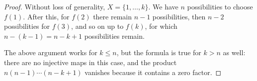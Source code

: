 \begin{proof}
Without loss of generality, $X = \{1, \ldots, k\}$.
We have $n$ possibilities to choose $f(1)$.
After this, for $f(2)$ there remain $n-1$ possibilities, then $n-2$ possibilities for $f(3)$,
and so on up to $f(k)$, for which $n-(k-1) = n-k+1$ possibilities remain.

The above argument works for $k \le n$, but the formula is true for $k > n$ as well:
there are no injective maps in this case, and the product $n(n-1) \cdots (n-k+1)$ vanishes because it contains a zero factor.
\end{proof}
